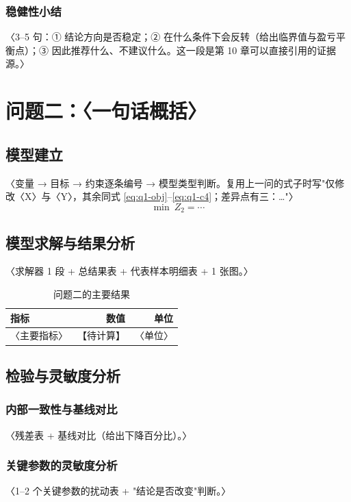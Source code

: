 \documentclass[12pt,a4paper]{ctexart}
\newif\ifwritemode
\newcommand{\ph}[1][待计算]{\textcolor{phred}{【#1】}}
\newcommand{\guide}[1]{%
  \ifwritemode\par\noindent{\small\color{guideblue}\textbf{【写作提示】}#1}\par\fi}
\newcommand{\tabhead}[1]{\textbf{#1}}
\begin{document}
\subsubsection{稳健性小结}
〈3–5 句：① 结论方向是否稳定；② 在什么条件下会反转（给出临界值与盈亏平衡点）；③ 因此推荐什么、不建议什么。这一段是第 10 章可以直接引用的证据源。〉

\section{问题二：〈一句话概括〉}\label{sec:q2}
\guide{与问题一同构：x.1 / x.2 / x.3 三段一个都不能少。模型复用时，x.1 要写清「仅修改了哪两处，其余同式 (x.n)」并列出差异点。}

\subsection{模型建立}
〈变量 → 目标 → 约束逐条编号 → 模型类型判断。复用上一问的式子时写"仅修改〈X〉与〈Y〉，其余同式 \eqref{eq:q1-obj}--\eqref{eq:q1-c4}；差异点有三：…"〉
\begin{equation}\label{eq:q2-obj}
  \min\ Z_2=\cdots
\end{equation}

\subsection{模型求解与结果分析}
〈求解器 1 段 + 总结果表 + 代表样本明细表 + 1 张图。〉
\begin{table}[htbp]\centering\small
  \caption{问题二的主要结果}\label{tab:q2-main}
  \begin{tabular}{lrr}
    \toprule
    \tabhead{指标} & \tabhead{数值} & \tabhead{单位} \\
    \midrule
    〈主要指标〉 & \ph & 〈单位〉 \\
    \bottomrule
  \end{tabular}
\end{table}

\subsection{检验与灵敏度分析}
\subsubsection{内部一致性与基线对比}
〈残差表 + 基线对比（给出下降百分比）。〉
\subsubsection{关键参数的灵敏度分析}
〈1–2 个关键参数的扰动表 + "结论是否改变"判断。〉
\end{document}

